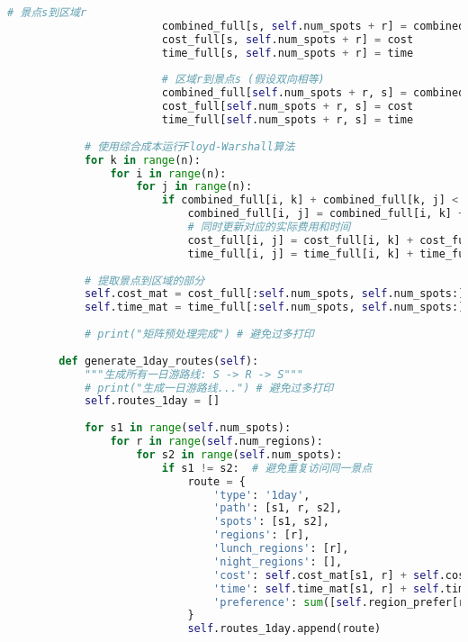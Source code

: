 \begin{lstlisting}[language=Python]
                        # 景点s到区域r
                        combined_full[s, self.num_spots + r] = combined_cost
                        cost_full[s, self.num_spots + r] = cost
                        time_full[s, self.num_spots + r] = time
                        
                        # 区域r到景点s (假设双向相等)
                        combined_full[self.num_spots + r, s] = combined_cost
                        cost_full[self.num_spots + r, s] = cost
                        time_full[self.num_spots + r, s] = time
            
            # 使用综合成本运行Floyd-Warshall算法
            for k in range(n):
                for i in range(n):
                    for j in range(n):
                        if combined_full[i, k] + combined_full[k, j] < combined_full[i, j]:
                            combined_full[i, j] = combined_full[i, k] + combined_full[k, j]
                            # 同时更新对应的实际费用和时间
                            cost_full[i, j] = cost_full[i, k] + cost_full[k, j]
                            time_full[i, j] = time_full[i, k] + time_full[k, j]
            
            # 提取景点到区域的部分
            self.cost_mat = cost_full[:self.num_spots, self.num_spots:]
            self.time_mat = time_full[:self.num_spots, self.num_spots:]
            
            # print("矩阵预处理完成") # 避免过多打印
            
        def generate_1day_routes(self):
            """生成所有一日游路线: S -> R -> S"""
            # print("生成一日游路线...") # 避免过多打印
            self.routes_1day = []
            
            for s1 in range(self.num_spots):
                for r in range(self.num_regions):
                    for s2 in range(self.num_spots):
                        if s1 != s2:  # 避免重复访问同一景点
                            route = {
                                'type': '1day',
                                'path': [s1, r, s2],
                                'spots': [s1, s2],
                                'regions': [r],
                                'lunch_regions': [r],
                                'night_regions': [],
                                'cost': self.cost_mat[s1, r] + self.cost_mat[s2, r],
                                'time': self.time_mat[s1, r] + self.time_mat[s2, r],
                                'preference': sum([self.region_prefer[r]]) + 2  # 景点基础偏好
                            }
                            self.routes_1day.append(route)
            

\end{lstlisting}
